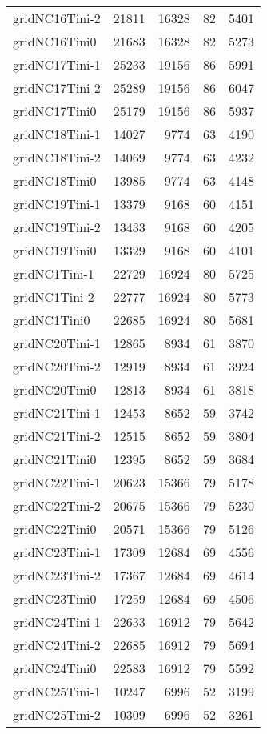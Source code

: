 \begin{longtable}{lrrrr}
gridNC16Tini-2 & 21811 & 16328 & 82 & 5401 \\
gridNC16Tini0 & 21683 & 16328 & 82 & 5273 \\
gridNC17Tini-1 & 25233 & 19156 & 86 & 5991 \\
gridNC17Tini-2 & 25289 & 19156 & 86 & 6047 \\
gridNC17Tini0 & 25179 & 19156 & 86 & 5937 \\
gridNC18Tini-1 & 14027 & 9774 & 63 & 4190 \\
gridNC18Tini-2 & 14069 & 9774 & 63 & 4232 \\
gridNC18Tini0 & 13985 & 9774 & 63 & 4148 \\
gridNC19Tini-1 & 13379 & 9168 & 60 & 4151 \\
gridNC19Tini-2 & 13433 & 9168 & 60 & 4205 \\
gridNC19Tini0 & 13329 & 9168 & 60 & 4101 \\
gridNC1Tini-1 & 22729 & 16924 & 80 & 5725 \\
gridNC1Tini-2 & 22777 & 16924 & 80 & 5773 \\
gridNC1Tini0 & 22685 & 16924 & 80 & 5681 \\
gridNC20Tini-1 & 12865 & 8934 & 61 & 3870 \\
gridNC20Tini-2 & 12919 & 8934 & 61 & 3924 \\
gridNC20Tini0 & 12813 & 8934 & 61 & 3818 \\
gridNC21Tini-1 & 12453 & 8652 & 59 & 3742 \\
gridNC21Tini-2 & 12515 & 8652 & 59 & 3804 \\
gridNC21Tini0 & 12395 & 8652 & 59 & 3684 \\
gridNC22Tini-1 & 20623 & 15366 & 79 & 5178 \\
gridNC22Tini-2 & 20675 & 15366 & 79 & 5230 \\
gridNC22Tini0 & 20571 & 15366 & 79 & 5126 \\
gridNC23Tini-1 & 17309 & 12684 & 69 & 4556 \\
gridNC23Tini-2 & 17367 & 12684 & 69 & 4614 \\
gridNC23Tini0 & 17259 & 12684 & 69 & 4506 \\
gridNC24Tini-1 & 22633 & 16912 & 79 & 5642 \\
gridNC24Tini-2 & 22685 & 16912 & 79 & 5694 \\
gridNC24Tini0 & 22583 & 16912 & 79 & 5592 \\
gridNC25Tini-1 & 10247 & 6996 & 52 & 3199 \\
gridNC25Tini-2 & 10309 & 6996 & 52 & 3261 \\

\end{longtable}
